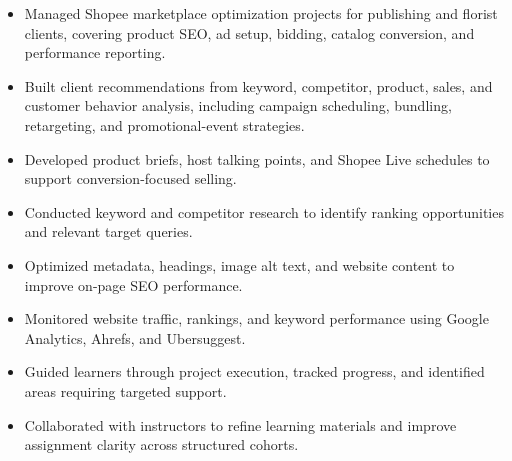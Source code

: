 
\begin{itemize}
  \item Managed Shopee marketplace optimization projects for publishing and florist clients, covering product SEO, ad setup, bidding, catalog conversion, and performance reporting.
  \item Built client recommendations from keyword, competitor, product, sales, and customer behavior analysis, including campaign scheduling, bundling, retargeting, and promotional-event strategies.
  \item Developed product briefs, host talking points, and Shopee Live schedules to support conversion-focused selling.
\end{itemize}

\begin{itemize}
  \item Conducted keyword and competitor research to identify ranking opportunities and relevant target queries.
  \item Optimized metadata, headings, image alt text, and website content to improve on-page SEO performance.
  \item Monitored website traffic, rankings, and keyword performance using Google Analytics, Ahrefs, and Ubersuggest.
\end{itemize}

\newpage
{}
\begin{itemize}
  \item Guided learners through project execution, tracked progress, and identified areas requiring targeted support.
  \item Collaborated with instructors to refine learning materials and improve assignment clarity across structured cohorts.
\end{itemize}
